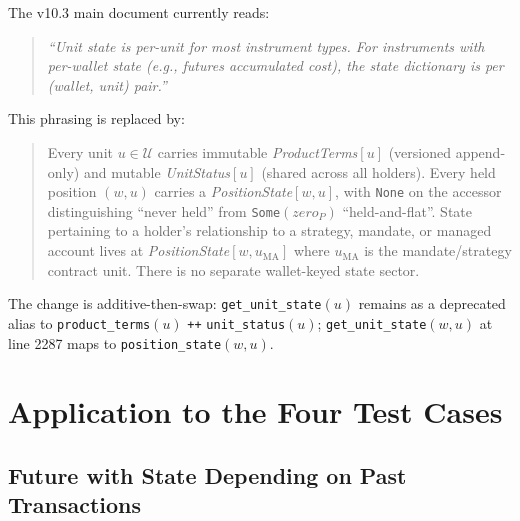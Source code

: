 \documentclass[11pt,a4paper]{article}
\begin{document}
The v10.3 main document currently reads:

\begin{quote}
\textit{``Unit state is per-unit for most instrument types. For instruments with per-wallet state (e.g., futures accumulated cost), the state dictionary is per (wallet, unit) pair.''}
\end{quote}

\noindent This phrasing is replaced by:

\begin{quote}
Every unit $u \in \mathcal{U}$ carries immutable \textit{ProductTerms}$[u]$ (versioned append-only) and mutable \textit{UnitStatus}$[u]$ (shared across all holders). Every held position $(w, u)$ carries a \textit{PositionState}$[w, u]$, with \texttt{None} on the accessor distinguishing ``never held'' from \texttt{Some}$(zero_P)$ ``held-and-flat''. State pertaining to a holder's relationship to a strategy, mandate, or managed account lives at \textit{PositionState}$[w, u_{\mathrm{MA}}]$ where $u_{\mathrm{MA}}$ is the mandate/strategy contract unit. There is no separate wallet-keyed state sector.
\end{quote}

\noindent The change is additive-then-swap: \texttt{get\_unit\_state}$(u)$ remains as a deprecated alias to \texttt{product\_terms}$(u)$ \texttt{++} \texttt{unit\_status}$(u)$; \texttt{get\_unit\_state}$(w, u)$ at line 2287 maps to \texttt{position\_state}$(w, u)$.

\section{Application to the Four Test Cases}
\label{sec:testcases}

\subsection{Future with State Depending on Past Transactions}
\end{document}
